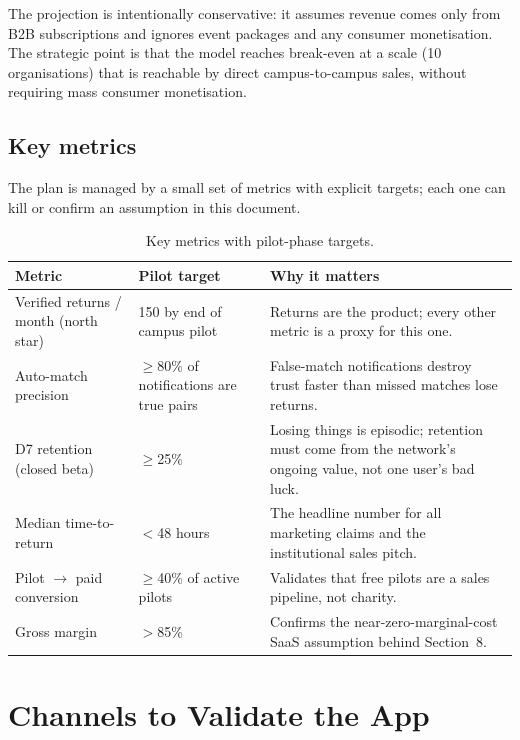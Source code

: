 \documentclass[11pt,a4paper]{article}
\begin{document}
The projection is intentionally conservative: it assumes revenue comes only from B2B
subscriptions and ignores event packages and any consumer monetisation. The strategic point
is that the model reaches break-even at a scale (10 organisations) that is reachable by
direct campus-to-campus sales, without requiring mass consumer monetisation.

\subsection{Key metrics}

The plan is managed by a small set of metrics with explicit targets; each one can kill or
confirm an assumption in this document.

\begin{table}[H]
\centering
\small
\renewcommand{\arraystretch}{1.35}
\begin{tabularx}{\textwidth}{>{\raggedright\arraybackslash}p{4.4cm} l Y}
\toprule
\textbf{Metric} & \textbf{Pilot target} & \textbf{Why it matters} \\
\midrule
Verified returns / month (north star) & 150 by end of campus pilot & Returns are the
product; every other metric is a proxy for this one. \\
Auto-match precision & $\geq$80\% of notifications are true pairs & False-match
notifications destroy trust faster than missed matches lose returns. \\
D7 retention (closed beta) & $\geq$25\% & Losing things is episodic; retention must come
from the network's ongoing value, not one user's bad luck. \\
Median time-to-return & $<$48 hours & The headline number for all marketing claims and
the institutional sales pitch. \\
Pilot $\rightarrow$ paid conversion & $\geq$40\% of active pilots & Validates that free
pilots are a sales pipeline, not charity. \\
Gross margin & $>$85\% & Confirms the near-zero-marginal-cost SaaS assumption behind
Section~8. \\
\bottomrule
\end{tabularx}
\caption{Key metrics with pilot-phase targets.}
\end{table}

\section{Channels to Validate the App}
\label{sec:validation}
\end{document}
